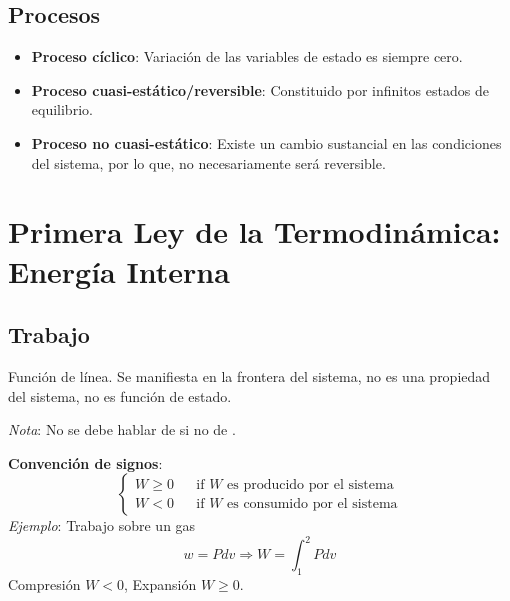     \subsection{Procesos}

    \begin{itemize}
        \item \textbf{Proceso cíclico}: Variación de las variables de estado es siempre cero.
        \item \textbf{Proceso cuasi-estático/reversible}: Constituido por infinitos estados de equilibrio.
        \item \textbf{Proceso no cuasi-estático}: Existe un cambio sustancial en las condiciones del sistema, por lo que, no necesariamente será reversible.
    \end{itemize}

\section{Primera Ley de la Termodinámica: Energía Interna}

    \subsection{Trabajo}

    Función de línea. Se manifiesta en la frontera del sistema, no es una propiedad del sistema, no es función de estado.

    \textit{Nota}: No se debe hablar de  si no de .

    \textbf{Convención de signos}: 
    \begin{equation}
        \left\{\begin{matrix}
            W \geq 0 &  & \text{if }W\text{ es producido por el sistema}\\ 
            W < 0 &  & \text{if }W\text{ es consumido por el sistema}
        \end{matrix}\right.
    \end{equation}
    \textit{Ejemplo}: Trabajo sobre un gas
    \begin{equation}
    \label{def_trabajo}
        w=Pdv \Rightarrow W=\int_{1}^{2}Pdv
    \end{equation}
    Compresión \(W < 0\), Expansión \(W \geq 0\).
    
